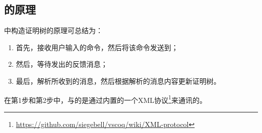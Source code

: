 \subsection{的原理}
中构造证明树的原理可总结为：
\begin{enumerate}
	\item 首先，接收用户输入的命令，然后将该命令发送到；
	\item 然后，等待发出的反馈消息；
	\item 最后，解析所收到的消息，然后根据解析的消息内容更新证明树。
\end{enumerate}

在第1步和第2步中，与的是通过内置的一个XML协议\footnote{\url{https://github.com/siegebell/vscoq/wiki/XML-protocol}}来通讯的。
